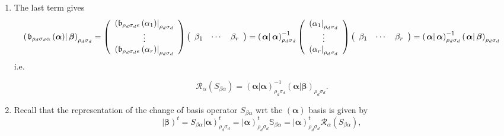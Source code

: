 \documentclass[aps,preprint]{revtex4}
\begin{document}
\begin{enumerate}
\begin{enumerate}
\begin{enumerate}
\item The last term gives 
\begin{equation}
\left( \left. \mathfrak{b}_{\rho _{d}\sigma _{d}\alpha }\left( \boldsymbol{%
\alpha }\right) \right\vert \boldsymbol{\beta }\right) _{\rho _{d}\sigma
_{d}}=\left( 
\begin{array}{c}
\left( \mathfrak{b}_{\rho _{d}\sigma _{d}e}\left( \alpha _{1}\right)
\right\vert _{\rho _{d}\sigma _{d}} \\ 
\vdots \\ 
\left( \mathfrak{b}_{\rho _{d}\sigma _{d}e}\left( \alpha _{r}\right)
\right\vert _{\rho _{d}\sigma _{d}}%
\end{array}%
\right) \left( 
\begin{array}{ccc}
\beta _{1} & \cdots & \beta _{r}%
\end{array}%
\right) =\left( \left. \overset{}{\boldsymbol{\alpha }}\right\vert 
\boldsymbol{\alpha }\right) _{\rho _{d}\sigma _{d}}^{-1}\left( 
\begin{array}{c}
\left( \alpha _{1}\right\vert _{\rho _{d}\sigma _{d}} \\ 
\vdots \\ 
\left( \alpha _{r}\right\vert _{\rho _{d}\sigma _{d}}%
\end{array}%
\right) \left( 
\begin{array}{ccc}
\beta _{1} & \cdots & \beta _{r}%
\end{array}%
\right) =\left( \left. \boldsymbol{\alpha }\right\vert \boldsymbol{\alpha }%
\right) _{\rho _{d}\sigma _{d}}^{-1}\left( \left. \boldsymbol{\alpha }%
\right\vert \boldsymbol{\beta }\right) _{\rho _{d}\sigma _{d}}
\end{equation}%
i.e.

\begin{equation}
\mathcal{R}_{\alpha }\left( S_{\beta \alpha }\right) =\left( \left. 
\boldsymbol{\alpha }\right\vert \boldsymbol{\alpha }\right) _{\rho
_{d}\sigma _{d}}^{-1}\left( \left. \boldsymbol{\alpha }\right\vert 
\boldsymbol{\beta }\right) _{\rho _{d}\sigma _{d}}.
\end{equation}

\item Recall that the representation of the change of basis operator $%
S_{\beta \alpha }$ wrt the $\left( \boldsymbol{\alpha }\right) $ basis is
given by 
\begin{equation*}
\left\vert \boldsymbol{\beta }\right) ^{t}=S_{\beta \alpha }\left\vert 
\boldsymbol{\alpha }\right) _{\rho _{d}\sigma _{d}}^{t}=\left\vert 
\boldsymbol{\alpha }\right) _{\rho _{d}\sigma _{d}}^{t}\mathbb{S}_{\beta
\alpha }=\left\vert \boldsymbol{\alpha }\right) _{\rho _{d}\sigma _{d}}^{t}%
\mathcal{R}_{\alpha }\left( S_{\beta \alpha }\right) ,
\end{equation*}


\end{enumerate}
\end{enumerate}
\end{enumerate}
\end{document}
